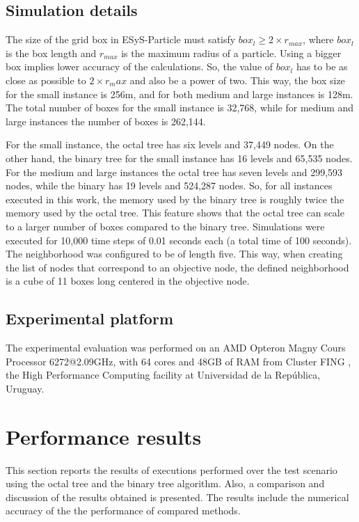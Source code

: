 \documentclass[runningheads]{llncs}
\begin{document}
\subsection{Simulation details}
The size of the grid box in ESyS-Particle must satisfy $ box_l \geq 2 \times r_{max}$, where $box_l$ is the box length and $r_{max}$ is the maximum radius of a particle. Using a bigger box implies lower accuracy of the calculations. So, the value of $box_l$ has to be as close as possible to $2 \times r_max$ and also be a power of two. This way, the box size for the small instance is 256m, and for both medium and large instances is 128m. The total number of boxes for the small instance is 32,768, while for medium and large instances the number of boxes is 262,144.

For the small instance, the octal tree has six levels and 
37,449 nodes. On the other hand, the binary tree for the small instance has 16 levels and 
65,535 nodes. 
For the medium and large instances the octal tree has seven levels and 299,593 nodes, while the binary has 19 levels and 524,287 nodes. So, for all instances executed in this work, the memory used by the binary tree is roughly twice the memory used by the octal tree. This feature shows that the octal tree  can scale to a larger number of boxes compared to the binary tree. 
Simulations were executed for 10,000 time steps of 0.01 seconds each (a total time of 100 seconds). The neighborhood was configured to be of length five. This way, when creating the list of nodes that correspond to an objective node, the defined neighborhood is a cube of 11 boxes long centered in the objective node.

\subsection{Experimental platform}
The experimental evaluation was performed on an AMD Opteron Magny Cours Processor 6272@2.09GHz, with 64 cores and 48GB of RAM
from
Cluster FING \cite{nesmachnow2010cluster}, the High Performance Computing facility at Universidad de la Rep\'ublica, Uruguay.


\section{Performance results}
\label{sec:perf_res}

This section reports the results of executions performed over the test scenario using the octal tree and the binary tree algorithm. Also, a comparison and discussion of the results obtained is presented. The results include the numerical accuracy of the the performance of compared methods.
\end{document}
